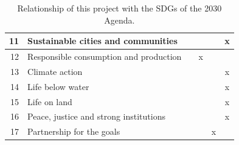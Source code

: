 \begin{table}[p]
\begin{tabular}{|rp{7.15cm}|cccc|}
        \multicolumn{1}{|r|}{11} & Sustainable cities and communities & \multicolumn{1}{c|}{} & \multicolumn{1}{c|}{} & \multicolumn{1}{c|}{} & x \\ \hline
        \multicolumn{1}{|r|}{12} & Responsible consumption and production & \multicolumn{1}{c|}{} & \multicolumn{1}{c|}{x} & \multicolumn{1}{c|}{} &  \\ \hline
        \multicolumn{1}{|r|}{13} & Climate action & \multicolumn{1}{c|}{} & \multicolumn{1}{c|}{} & \multicolumn{1}{c|}{} & x \\ \hline
        \multicolumn{1}{|r|}{14} & Life below water & \multicolumn{1}{c|}{} & \multicolumn{1}{c|}{} & \multicolumn{1}{c|}{} & x \\ \hline
        \multicolumn{1}{|r|}{15} & Life on land & \multicolumn{1}{c|}{} & \multicolumn{1}{c|}{} & \multicolumn{1}{c|}{} & x \\ \hline
        \multicolumn{1}{|r|}{16} & Peace, justice and strong institutions & \multicolumn{1}{c|}{} & \multicolumn{1}{c|}{} & \multicolumn{1}{c|}{} & x \\ \hline
        \multicolumn{1}{|r|}{17} & Partnership for the goals & \multicolumn{1}{c|}{} & \multicolumn{1}{c|}{} & \multicolumn{1}{c|}{x} & \\ \hline
    \end{tabular}

    \caption{Relationship of this project with the SDGs of the 2030 Agenda.}
    \label{tab:a:sdg}
\end{table}